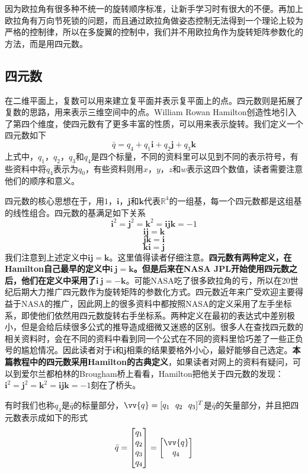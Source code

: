 \documentclass[11pt]{article}
\begin{document}
因为欧拉角有很多种不统一的旋转顺序标准，让新手学习时有很大的不便。再加上欧拉角有万向节死锁的问题，而且通过欧拉角做姿态控制无法得到一个理论上较为严格的控制律，所以在多旋翼的控制中，我们并不用欧拉角作为旋转矩阵参数化的方法，而是用四元数。

\subsection{四元数}
在二维平面上，复数可以用来建立复平面并表示复平面上的点。四元数则是拓展了复数的思路，用来表示三维空间中的点。William Rowan Hamilton创造性地引入了第四个维度，使四元数有了更多丰富的性质，可以用来表示旋转。我们定义一个四元数如下
$$
\bar{q} = q_4 + q_1\mathbf{i} + q_2\mathbf{j}+ q_3\mathbf{k}
$$  
上式中，$q_1$，$q_2$，$q_3$和$q_4$是四个标量，不同的资料里可以见到不同的表示符号，有些资料中将$q_4$表示为$q_0$，有些资料则用$x$，$y$，$z$和$w$表示这四个数值，读者需要注意他们的顺序和意义。

四元数的核心思想在于，用$1$，$\mathbf{i}$，$\mathbf{j}$和$\mathbf{k}$代表$\mathbb{R}^4$的一组基，每一个四元数都是这组基的线性组合。四元数的基满足如下关系
$$
\mathbf{i}^2 = \mathbf{j}^2 = \mathbf{k}^2 = \mathbf{i}\mathbf{j}\mathbf{k} = -1
$$
$$
\mathbf{i}\mathbf{j}=\mathbf{k}
$$
$$
\mathbf{j}\mathbf{k}=\mathbf{i}
$$
$$
\mathbf{k}\mathbf{i}=\mathbf{j}
$$
我们注意到上述定义中$\mathbf{i}\mathbf{j}=\mathbf{k}$。这里值得读者仔细注意。\textbf{四元数有两种定义，在Hamilton自己最早的定义中$\mathbf{i}\ \mathbf{j}=\mathbf{k}$。但是后来在NASA JPL开始使用四元数之后，他们在定义中采用了$\mathbf{i}\ \mathbf{j}=-\mathbf{k}$}。可能NASA吃了很多欧拉角的亏，所以在20世纪后期大力推广四元数作为旋转矩阵的参数化方式。四元数近年来广受欢迎主要得益于NASA的推广，因此网上的很多资料中都按照NASA的定义采用了左手坐标系，即使他们依然用四元数旋转右手坐标系。两种定义在最初的表达式中差别极小，但是会给后续很多公式的推导造成细微又迷惑的区别。很多人在查找四元数的相关资料时，会在不同的资料中看到同一个公式在不同的资料里恰巧差了一些正负号的尴尬情况。因此读者对于$\mathbf{i}$和$\mathbf{j}$相乘的结果要格外小心，最好能够自己选定。\textbf{本篇教程中的四元数采用Hamilton的古典定义}，如果读者对网上的资料有疑问，可以到爱尔兰都柏林的Brougham桥上看看，Hamilton把他关于四元数的发现：$\mathbf{i}^2 = \mathbf{j}^2 = \mathbf{k}^2 = \mathbf{i}\mathbf{j}\mathbf{k} = -1$刻在了桥头。

有时我们也称$q_4$是$\bar{q}$的标量部分，$\vv{q} = [q_1 \ \ q_2 \ \ q_3]^T$是$\bar{q}$的矢量部分，并且把四元数表示成如下的形式
$$
\bar{q} 
=
				   \begin{bmatrix}
                      q_1\\
                      q_2\\
                      q_3\\
                      q_4
                   \end{bmatrix}
              =  \begin{bmatrix}
                      \vv{q}\\
                      q_4
                   \end{bmatrix} 
$$
\end{document}
